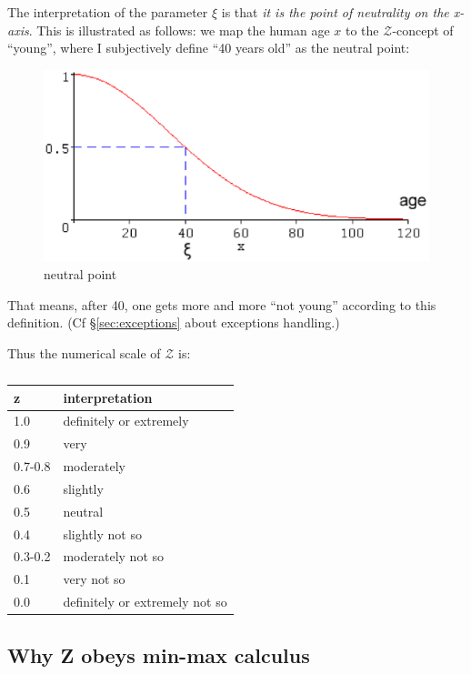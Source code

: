 The interpretation of the parameter $\xi$ is that \textit{it is the point of neutrality on the x-axis}.  This is illustrated as follows:  we map the human age $x$ to the $\mathcal{Z}$-concept of ``young'', where I subjectively define ``40 years old'' as the neutral point:
\begin{figure}[H]
\centering
\includegraphics[scale=0.5]{NeutralPoint.eps}
\caption{neutral point}
\end{figure}
That means, after 40, one gets more and more ``not young'' according to this definition.  (Cf \S\ref{sec:exceptions} about exceptions handling.)

Thus the numerical scale of $\mathcal{Z}$ is:\\
\begin{table}[H]
\parbox{3cm}{\caption{}}
\begin{tabular}{|l||l|}
\hline
{\bfseries z} & {\bfseries interpretation}\\ \hline
1.0     & definitely or extremely\\
0.9     & very\\
0.7-0.8 & moderately\\
0.6     & slightly\\ \hline
0.5     & neutral\\ \hline
0.4     & slightly not so\\
0.3-0.2 & moderately not so\\
0.1     & very not so\\
0.0     & definitely or extremely not so\\ \hline
\end{tabular}
\end{table}

\subsection{Why Z obeys min-max calculus}
\label{sec:min-max-VS-sum-product}

